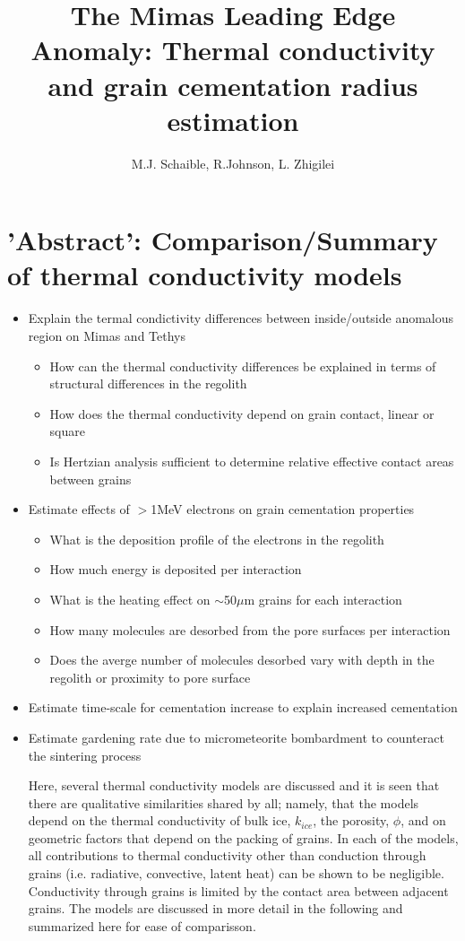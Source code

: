 \documentclass[11pt]{article} %
\title{The Mimas Leading Edge Anomaly: Thermal conductivity and grain cementation radius estimation}
\author{M.J. Schaible, R.Johnson, L. Zhigilei}
\begin{document}
\maketitle

\section{'Abstract': Comparison/Summary of thermal conductivity models}

	\begin{itemize}
	Goals:
	\item Explain the termal condictivity differences between inside/outside anomalous region on Mimas and Tethys
		\begin{itemize}
		\item How can the thermal conductivity differences be explained in terms of structural differences in the regolith
		\item How does the thermal conductivity depend on grain contact, linear or square
		\item Is Hertzian analysis sufficient to determine relative effective contact areas between grains
		\end{itemize}
	\item Estimate effects of $>$1MeV electrons on grain cementation properties
		\begin{itemize}
		\item What is the deposition profile of the electrons in the regolith
		\item How much energy is deposited per interaction
		\item What is the heating effect on $\sim$50$\mu$m grains for each interaction
		\item How many molecules are desorbed from the pore surfaces per interaction
		\item Does the averge number of molecules desorbed vary with depth in the regolith or proximity to pore surface
		\end{itemize}
	\item Estimate time-scale for cementation increase to explain increased cementation
	\item Estimate gardening rate due to micrometeorite bombardment to counteract the sintering process

	Here, several thermal conductivity models are discussed and it is seen that there are qualitative similarities shared by all; namely, that the models depend on the thermal conductivity of bulk ice, $k_{ice}$, the porosity, $\phi$, and on geometric factors that depend on the packing of grains. In each of the models, all contributions to thermal conductivity  other than conduction through grains (i.e. radiative, convective, latent heat) can be shown to be negligible. Conductivity through grains is limited by the contact area between adjacent grains. The models are discussed in more detail in the following and summarized here for ease of comparisson.
	

\end{itemize}
\end{document}
